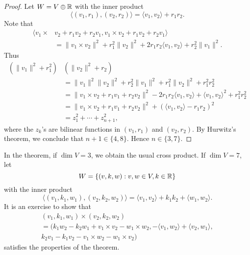 \begin{proof}
	Let $W=V\oplus\mathbb{R}$ with the inner product  
	\[
		\langle (v_1,r_1),(v_2,r_2)\rangle = \langle v_1,v_2\rangle+r_1r_2.
	\]
	Note that
	\begin{align*}
		\langle v_1\times &v_2+r_1v_2+r_2v_1,v_1\times v_2+r_1v_2+r_2v_1\rangle\\
		&=\|v_1\times v_2\|^2+r_1^2\|v_2\|^2+2r_1r_2\langle v_1,v_2\rangle+r_2^2\|v_1\|^2.
	\end{align*}
	Thus  
	\begin{align*}
		(\|v_1\|^2+r_1^2)&(\|v_2\|^2+r_2)\\
		&= \|v_1\|^2\|v_2\|^2+r_2^2\|v_1\|^2+r_1^2\|v_2\|^2+r_1^2r_2^2\\
		&=\|v_1\times v_2+r_1v_1+r_2v_2\|^2-2r_1r_2\langle v_1,v_2\rangle+\langle v_1,v_2\rangle^2+r_1^2r_2^2\\
		&=\|v_1\times v_2+r_1v_1+r_2v_2\|^2+(\langle v_1,v_2\rangle-r_1r_2)^2\\
		&=z_1^2+\cdots+z_{n+1}^2,
	\end{align*}
	where the $z_k$'s are bilinear functions in $(v_1,r_1)$ and $(v_2,r_2)$. 
	By Hurwitz's theorem, we conclude that 
	$n+1\in\{4,8\}$. Hence $n\in\{3,7\}$.
\end{proof}

In the theorem, if $\dim V=3$, we obtain the usual cross product. 
If $\dim V=7$, let 
\[
	W=\{(v,k,w):v,w\in V,k\in\mathbb{R}\}
\]
with the inner product 
\[
	\langle (v_1,k_1,w_1),(v_2,k_2,w_2)\rangle = \langle v_1,v_2\rangle+k_1k_2+\langle w_1,w_2\rangle.
\]
It is an exercise to show that 
\begin{multline*}
	(v_1,k_1,w_1)\times (v_2,k_2,w_2)\\
	=(k_1w_2-k_2w_1+v_1\times v_2-w_1\times w_2,
	-\langle v_1,w_2\rangle+\langle v_2,w_1\rangle,\\
	k_2v_1-k_1v_2-v_1\times w_2-w_1\times v_2)
\end{multline*}
satisfies the properties of the theorem. 

